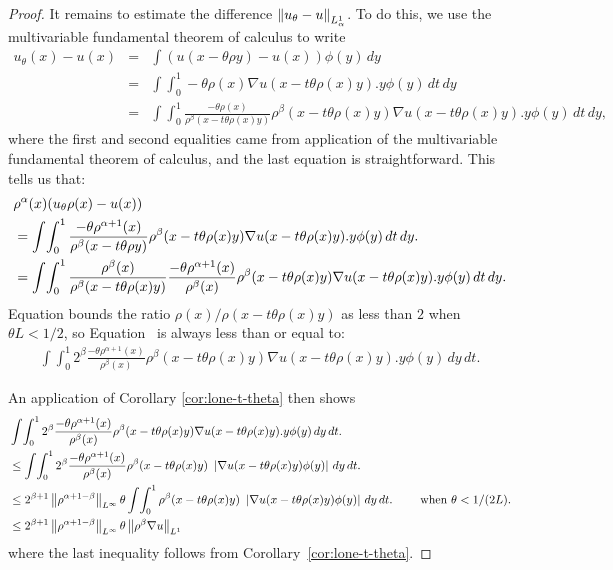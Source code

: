 \begin{proof}
  It remains to estimate the difference $\left\lVert u_\theta - u \right\rVert_{L^1_\alpha}$. To
  do this, we use the multivariable fundamental
  theorem of calculus to write
  \begin{eqnarray*}
    u_\theta(x) - u(x)
    &=& \int (u(x - \theta \rho y) - u(x)) \phi(y) \, dy \\
    &=& \int \! \int_0^1
    -\theta \rho(x) \nabla u(x - t \theta \rho(x) y).y \phi(y) \, dt \, dy \\
    &=& \int \! \int_0^1
    \frac{-\theta \rho(x)}{\rho^\beta(x-t\theta \rho(x) y)} 
    \rho^\beta(x - t\theta \rho(x) y) \nabla u(x - t \theta
        \rho(x) y).y \phi(y) \, dt \, dy,
  \end{eqnarray*}
  where the first and second equalities came from application of
  the multivariable fundamental theorem of calculus, and the last
  equation is straightforward. This tells us that:
  \begin{align}
  \notag
  & \rho^{\alpha}(x) ( u_\theta \rho(x) - u(x) )
  \\
  \notag
  & = \int \! \int_0^1
  \frac{-\theta \rho^{\alpha+1}(x)}{\rho^\beta(x-t\theta \rho y)} 
  \rho^\beta(x - t\theta \rho(x) y) 
  \nabla u(x - t \theta \rho(x) y).y \phi(y) \, dt \, dy.
  \\
    \label{eqn:utheta-l1-alpha}
  &= \int \! \int_0^1
  \frac{\rho^\beta(x)}{\rho^\beta (x- t \theta \rho(x)y)}
  \frac{-\theta \rho^{\alpha+1}(x)}{\rho^\beta(x)}
  \rho^{\beta}(x - t \theta \rho(x) y )
  \nabla u(x - t \theta \rho(x) y).y \phi(y) \, dt \, dy.
  \end{align}
  Equation  bounds the ratio $\rho(x)/ \rho(x -
    t\theta \rho(x) y)$ as less than $2$ when $\theta L < 1/2$,
  so Equation~ is always less than or
  equal to:
  \begin{align}
  \int \! \int_0^1
  2^{\beta}
  \frac{-\theta \rho^{\alpha+1}(x)}{\rho^\beta(x)}
  \rho^{\beta}(x - t \theta \rho(x) y )
  \nabla u(x - t \theta \rho(x) y).y \phi(y) \, dy \, dt.
  \end{align}

  An application of Corollary \ref{cor:lone-t-theta} then shows
  \begin{align}
  & \int \! \int_0^1
  2^{\beta}
  \frac{-\theta \rho^{\alpha+1}(x)}{\rho^\beta(x)}
  \rho^{\beta}(x - t \theta \rho(x) y )
  \nabla u(x - t \theta \rho(x) y).y \phi(y) \, dy \, dt.
  \\
  & \leq \int \! \int_0^1
  2^{\beta}
  \frac{-\theta \rho^{\alpha+1}(x)}{\rho^\beta(x)}
  \rho^{\beta}(x - t \theta \rho(x) y ) \ 
  \left|\nabla u(x - t \theta \rho(x) y) \phi(y)\right| \, dy \, dt.
  \\
  &
  \leq 2^{\beta+1} \linf{\rho^{\alpha+1-\beta}} \theta
  \int \! \int_0^1
  \rho^{\beta}(x - t \theta \rho(x) y ) \ 
  \left|\nabla u(x - t \theta \rho(x) y) \phi(y)\right| \, dy \, dt.
  \qquad \text{ when } \theta < 1 / (2L).
  \\
  &
  \leq 2^{\beta+1} \linf{\rho^{\alpha+1-\beta}} \theta \lone{\rho^\beta \nabla u}
  \end{align}
  where the last inequality follows from
  Corollary~\ref{cor:lone-t-theta}.


\end{proof}
